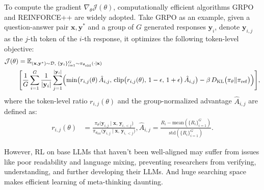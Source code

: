 To compute the gradient $\nabla_\theta\mathcal{J}(\theta)$, computationally efficient algorithms GRPO \citep{shao2024deepseekmath} and REINFORCE++ \citep{hu2025reinforce++} are widely adopted.
Take GRPO as an example, given a question-answer pair $\mathbf{x}, \mathbf{y}^*$ and a group of $G$ generated responses $\mathbf{y}_i$, denote $\mathbf{y}_{i,j}$ as the $j$-th token of the $i$-th response, it optimizes the following token-level objective:
{\small\begin{equation}
    \begin{aligned}
        \mathcal{J}(\theta)&=
        \mathbb{E}_{(\mathbf{x}, \mathbf{y}^*)\sim\mathcal{D},\;\{\mathbf{y}_i\}_{i=1}^G\sim\pi_{\theta_{\mathrm{old}}}(\cdot\mid \mathbf{x})} \\
        &\Biggl[
            \frac{1}{G}
            \sum_{i=1}^G
            \frac{1}{\lvert \mathbf{y}_i\rvert}
            \sum_{j=1}^{\lvert \mathbf{y}_i\rvert}
            \Bigl(
                \min\bigl(r_{i,j}(\theta)\,\hat A_{i,j},\,
                \mathrm{clip}\bigl(r_{i,j}(\theta),\,1-\epsilon,\,1+\epsilon\bigr)\,\hat A_{i,j}\bigr)
                -\beta\,D_{\mathrm{KL}}\bigl(\pi_\theta\|\pi_{\mathrm{ref}}\bigr)
            \Bigr)
        \Biggr], 
    \end{aligned}
    \label{eq:grpo}
\end{equation}}
where the token-level ratio $r_{i,j}(\theta)$ and the group-normalized advantage $\hat A_{i,j}$ are defined as:
\begin{align*}
    r_{i,j}(\theta)
    &=
    \frac{
    \pi_\theta\bigl(\mathbf{y}_{i,j}\mid \mathbf{x},\,\mathbf{y}_{i,<j}\bigr)
    }{
    \pi_{\theta_{\mathrm{old}}}\bigl(\mathbf{y}_{i,j}\mid \mathbf{x},\,\mathbf{y}_{i,<j}\bigr)
    },
    \hat{A}_{i,j} = \frac{R_i - \text{mean}(\{R_i\}_{i=1}^G)}{\text{std}(\{R_i\}_{i=1}^G)}.
\end{align*}


However, RL on base LLMs that haven't been well-aligned may suffer from issues like poor readability and language mixing, preventing researchers from verifying, understanding, and further developing their LLMs. And huge searching space makes efficient learning of meta-thinking daunting.


